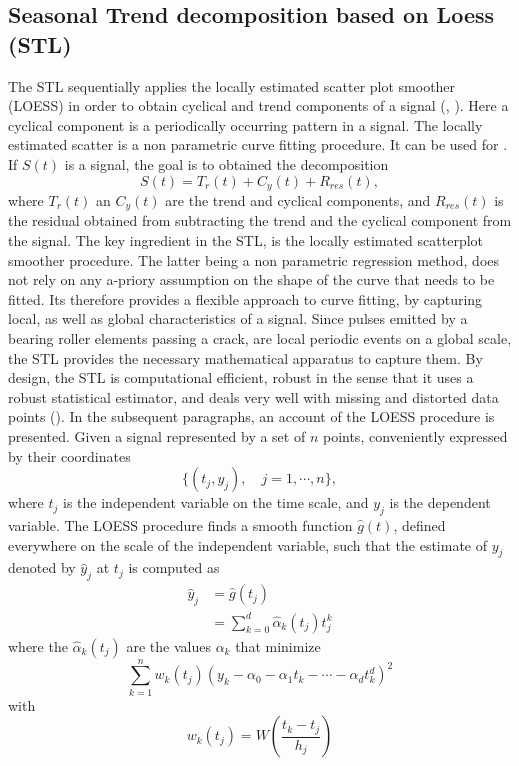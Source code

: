 \documentclass[../Main/thesis.tex]{subfiles}
\begin{document}
\justify
\subsection{Seasonal Trend decomposition based on Loess (STL)}
The STL sequentially applies the locally estimated scatter plot smoother (LOESS) in order to obtain cyclical and trend components of a signal (\cite{Cleveland-1979}, \cite{Cleveland-et-al-1988}). Here a cyclical component is a periodically occurring pattern in a signal. The  locally estimated scatter is a non parametric curve fitting procedure.  It can be used for .
If $S(t)$ is a signal, the goal is to obtained the decomposition 
\begin{equation}
S(t) = T_{r}(t) + C_{y}(t) + R_{res}(t),
\end{equation} 
where $T_{r}(t)$ an $C_{y}(t)$ are the trend and cyclical components, and $R_{res}(t)$ is the residual obtained from subtracting  the trend and the cyclical component from the signal. The key ingredient in the STL, is the locally estimated scatterplot smoother procedure. The latter being a non parametric regression method, does not rely on any a-priory assumption on the shape of the curve that needs to be fitted. Its therefore provides a flexible approach to curve fitting, by capturing local, as well as global characteristics of a signal. Since pulses emitted by a bearing roller elements passing a crack, are local periodic events on a global scale, the STL provides the necessary mathematical apparatus to capture them.
\justify
By design, the STL is computational efficient, robust in the sense that it uses a robust statistical estimator, and deals very well with missing and distorted data points (\cite{Cleveland-et-al-1990}). In the subsequent paragraphs, an account of the LOESS procedure is presented.
\justify
Given a signal represented by a set of $n$ points, conveniently expressed by their coordinates
\begin{equation}
\{ (t_{j}, y_{j}), \quad j = 1, \cdots, n\},
\end{equation}
where $t_{j}$ is the independent variable on the time scale, and $y_{j}$ is the dependent variable. The LOESS procedure finds a smooth function $\hat{g}(t)$, defined everywhere on the scale of the independent variable, such that the estimate of $y_{j}$ denoted by $\hat{y}_{j}$ at $t_{j}$ is computed as 
\begin{equation}
\begin{split}
\hat{y}_{j} &= \hat{g}(t_{j}) \\
                &=\sum_{k=0}^{d}\hat{\alpha}_{k}(t_{j})t_{j}^{k}
\end{split}
\end{equation}
where the $\hat{\alpha}_{k}(t_{j})$ are the values $\alpha_{k}$ that minimize 
\begin{equation}
\sum_{k=1}^{n}w_{k}(t_{j})\left(y_{k}-\alpha_{0}-\alpha_{1}t_{k}-\cdots -\alpha_{d}t_{k}^{d}\right)^{2}
\end{equation}
with 
\begin{equation}
w_{k}(t_{j}) = W\left( \frac{t_{k}-t_{j}}{h_{j}} \right)
\end{equation}
\end{document}
